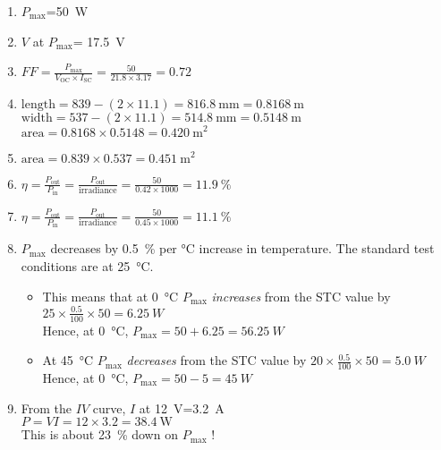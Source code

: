\documentclass{article} %
\begin{document}
\begin{solution}\label{sol:ex1}
    \begin{enumerate}[label=\alph*)]
    \item	$P_\text{max}$=\SI{50}{W}
    \item	$V$ at $P_\text{max}$= \SI{17.5}{V}
    \item	$FF=\frac{P_\text{max}}{V_\text{OC}\times I_\text{SC}}=\frac{50}{21.8\times 3.17}=0.72$
    \item $\text{length}=839-(2\times 11.1)=\SI{816.8}{\milli\metre}=\SI{0.8168}{\metre}$\\
    $\text{width}=537-(2\times 11.1)=\SI{514.8}{\milli\metre}=\SI{0.5148}{\metre}$\\
    $\text{area}=0.8168\times 0.5148=\SI{0.420}{\metre\squared}$
    \item $\text{area}=0.839\times 0.537=\SI{0.451}{\metre\squared}$
    \item $\eta=\frac{P_\text{out}}{P_\text{in}}=\frac{P_\text{out}}{\text{irradiance}}=\frac{50}{0.42\times 1000}=\SI{11.9}{\percent}$
    \item $\eta=\frac{P_\text{out}}{P_\text{in}}=\frac{P_\text{out}}{\text{irradiance}}=\frac{50}{0.45\times 1000}=\SI{11.1}{\percent}$
    \item $P_\text{max}$ decreases by \SI{0.5}{\percent} per \si{\celsius} increase in temperature. The standard test conditions are at \SI{25}{\celsius}.
        \begin{itemize}
        \item	This means that at \SI{0}{\celsius } $P_\text{max}$ \emph{increases} from the STC value by $25\times \frac{0.5}{100}\times 50=\SI{6.25}{W}$\\
        Hence, at \SI{0}{\celsius}, $P_\text{max}=50+6.25=\SI{56.25}{W}$
        \item	At \SI{45}{\celsius } $P_\text{max}$ \emph{decreases} from the STC value by $20\times \frac{0.5}{100}\times 50=\SI{5.0}{W}$\\
        Hence, at \SI{0}{\celsius}, $P_\text{max}=50-5=\SI{45}{W}$
        \end{itemize}
\item From the $IV$ curve, $I$ at \SI{12}{V}=\SI{3.2}{\ampere}\\
$P=VI=12\times 3.2=\SI{38.4}{\watt}$\\
This is about \SI{23}{\percent} down on $P_\text{max}$ !
        
\end{enumerate}

\end{solution}
\end{document}
